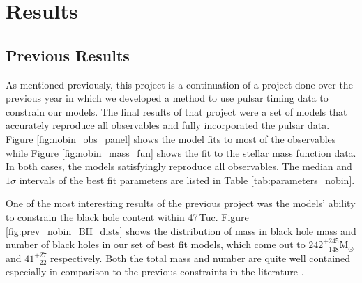 


\section{Results}



\subsection{Previous Results}

As mentioned previously, this project is a continuation of a project done over the previous year in
which we developed a method to use pulsar timing data to constrain our models. The final results of
that project were a set of models that accurately reproduce all observables and fully incorporated
the pulsar data. Figure \ref{fig:nobin_obs_panel} shows the model fits to most of the observables
while Figure \ref{fig:nobin_mass_fun} shows the fit to the stellar mass function data. In both
cases, the models satisfyingly reproduce all observables. The median and $1\sigma$ intervals of the
best fit parameters are listed in Table \ref{tab:parameters_nobin}.

One of the most interesting results of the previous project was the models' ability to constrain the
black hole content within 47\,Tuc. Figure \ref{fig:prev_nobin_BH_dists} shows the distribution of
mass in black hole mass and number of black holes in our set of best fit models, which come out to
$242^{+245}_{-148} \mathrm{M}_\odot$ and $41^{+27}_{-22}$ respectively. Both the total mass and
number are quite well contained especially in comparison to the previous constraints in the
literature \citep[see e.g.][]{Henault-Brunet2020,Weatherford2019}.





